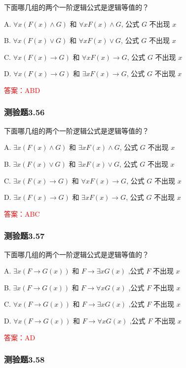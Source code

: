\documentclass[UTF8, heading=true]{ctexart}
\begin{document}
下面哪几组的两个一阶逻辑公式是逻辑等值的？

A. $\forall x(F(x) \wedge G)$ 和 $\forall x F(x) \wedge G$, 公式 $G$ 不出现 $x$

B. $\forall x(F(x) \vee G)$ 和 $\forall x F(x) \vee G$, 公式 $G$ 不出现 $x$

C. $\forall x(F(x) \rightarrow G)$ 和 $\forall x F(x) \rightarrow G$, 公式 $G$ 不出现 $x$

D. $\forall x(F(x) \rightarrow G)$ 和 $\exists x F(x) \rightarrow G$, 公式 $G$ 不出现 $x$

\textcolor{red}{答案：ABD}

\subsubsection{测验题3.56}

下面哪几组的两个一阶逻辑公式是逻辑等值的？

A. $\exists x(F(x) \wedge G)$ 和 $\exists x F(x) \wedge G$, 公式 $G$ 不出现 $x$

B. $\exists x(F(x) \vee G)$ 和 $\exists x F(x) \vee G$, 公式 $G$ 不出现 $x$

C. $\exists x(F(x) \rightarrow G)$ 和 $\forall x F(x) \rightarrow G$, 公式 $G$ 不出现 $x$

D. $\exists x(F(x) \rightarrow G)$ 和 $\exists x F(x) \rightarrow G$, 公式 $G$ 不出现 $x$

\textcolor{red}{答案：ABC}

\subsubsection{测验题3.57}

下面哪几组的两个一阶逻辑公式是逻辑等值的？

A. $\exists x(F \rightarrow G(x))$ 和 $F \rightarrow \exists x G(x)$ ,公式 $F$ 不出现 $x$

B.
$\exists x(F \rightarrow G(x))$ 和 $F \rightarrow \forall x G(x)$ ,公式 $F$ 不出现 $x$

C.
$\forall x(F \rightarrow G(x))$ 和 $F \rightarrow \exists x G(x)$ ,公式 $F$ 不出现 $x$

D.
$\forall x(F \rightarrow G(x))$ 和 $F \rightarrow \forall x G(x)$ ,公式 $F$ 不出现 $x$

\textcolor{red}{答案：AD}

\subsubsection{测验题3.58}
\end{document}
